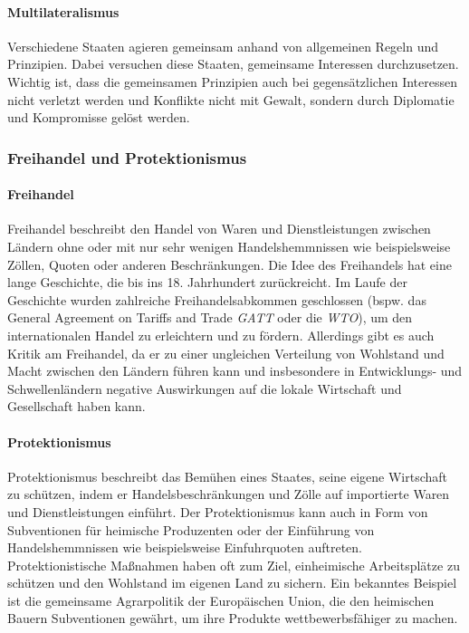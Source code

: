 \documentclass{article}
\begin{document}
	\paragraph{Multilateralismus}
	Verschiedene Staaten agieren gemeinsam anhand von allgemeinen Regeln und Prinzipien. Dabei versuchen diese Staaten, gemeinsame Interessen durchzusetzen. Wichtig ist, dass die gemeinsamen Prinzipien auch bei gegensätzlichen Interessen nicht verletzt werden und Konflikte nicht mit Gewalt, sondern durch Diplomatie und Kompromisse gelöst werden.

	\subsubsection{Freihandel und Protektionismus}
	\paragraph{Freihandel}
	Freihandel beschreibt den Handel von Waren und Dienstleistungen zwischen Ländern ohne oder mit nur sehr wenigen Handelshemmnissen wie beispielsweise Zöllen, Quoten oder anderen Beschränkungen. Die Idee des Freihandels hat eine lange Geschichte, die bis ins 18. Jahrhundert zurückreicht. Im Laufe der Geschichte wurden zahlreiche Freihandelsabkommen geschlossen (bspw. das General Agreement on Tariffs and Trade \textit{GATT} oder die \textit{WTO}), um den internationalen Handel zu erleichtern und zu fördern. Allerdings gibt es auch Kritik am Freihandel, da er zu einer ungleichen Verteilung von Wohlstand und Macht zwischen den Ländern führen kann und insbesondere in Entwicklungs- und Schwellenländern negative Auswirkungen auf die lokale Wirtschaft und Gesellschaft haben kann.

	\paragraph{Protektionismus}
	Protektionismus beschreibt das Bemühen eines Staates, seine eigene Wirtschaft zu schützen, indem er Handelsbeschränkungen und Zölle auf importierte Waren und Dienstleistungen einführt. Der Protektionismus kann auch in Form von Subventionen für heimische Produzenten oder der Einführung von Handelshemmnissen wie beispielsweise Einfuhrquoten auftreten. Protektionistische Maßnahmen haben oft zum Ziel, einheimische Arbeitsplätze zu schützen und den Wohlstand im eigenen Land zu sichern. Ein bekanntes Beispiel ist die gemeinsame Agrarpolitik der Europäischen Union, die den heimischen Bauern Subventionen gewährt, um ihre Produkte wettbewerbsfähiger zu machen.
\end{document}
